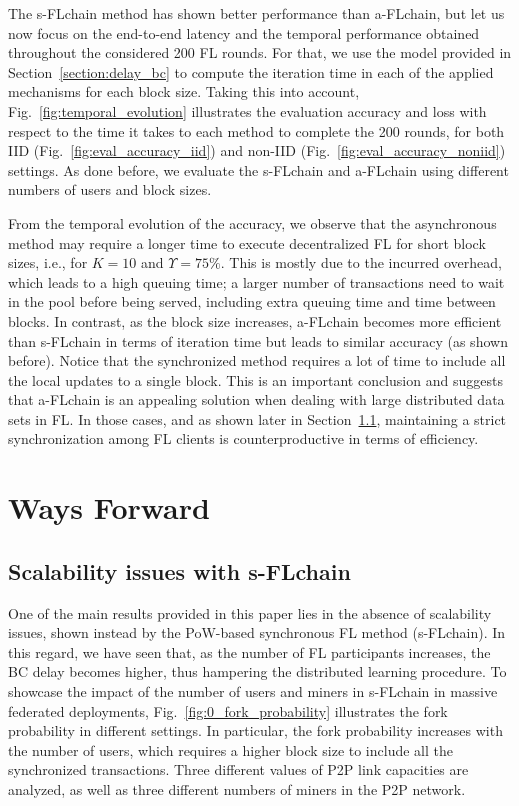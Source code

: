 \documentclass[10pt,journal,compsoc]{IEEEtran}
\begin{document}
The s-FLchain method has shown better performance than a-FLchain, but let us now focus on the end-to-end latency and the temporal performance obtained throughout the considered 200 FL rounds. For that, we use the model provided in Section~\ref{section:delay_bc} to compute the iteration time in each of the applied mechanisms for each block size. Taking this into account, Fig.~\ref{fig:temporal_evolution} illustrates the evaluation accuracy and loss with respect to the time it takes to each method to complete the 200 rounds, for both IID (Fig.~\ref{fig:eval_accuracy_iid}) and non-IID (Fig.~\ref{fig:eval_accuracy_noniid}) settings. As done before, we evaluate the s-FLchain and a-FLchain using different numbers of users and block sizes.

From the temporal evolution of the accuracy, we observe that the asynchronous method may require a longer time to execute decentralized FL for short block sizes, i.e., for $K=10$ and $\Upsilon = 75\%$. This is mostly due to the incurred overhead, which leads to a high queuing time; a larger number of transactions need to wait in the pool before being served, including extra queuing time and time between blocks. In contrast, as the block size increases, a-FLchain becomes more efficient than s-FLchain in terms of iteration time but leads to similar accuracy (as shown before). Notice that the synchronized method requires a lot of time to include all the local updates to a single block. This is an important conclusion and suggests that a-FLchain is an appealing solution when dealing with large distributed data sets in FL. In those cases, and as shown later in Section~\ref{section:scalability_sflchain}, maintaining a strict synchronization among FL clients is counterproductive in terms of efficiency.

\section{Ways Forward} %
\label{section:open}

\subsection{Scalability issues with s-FLchain}
\label{section:scalability_sflchain}

One of the main results provided in this paper lies in the absence of scalability issues, shown instead by the PoW-based synchronous FL method (s-FLchain). In this regard, we have seen that, as the number of FL participants increases, the BC delay becomes higher, thus hampering the distributed learning procedure. To showcase the impact of the number of users and miners in s-FLchain in massive federated deployments, Fig.~\ref{fig:0_fork_probability} illustrates the fork probability in different settings. In particular, the fork probability increases with the number of users, which requires a higher block size to include all the synchronized transactions. Three different values of P2P link capacities are analyzed, as well as three different numbers of miners in the P2P network.
\end{document}
